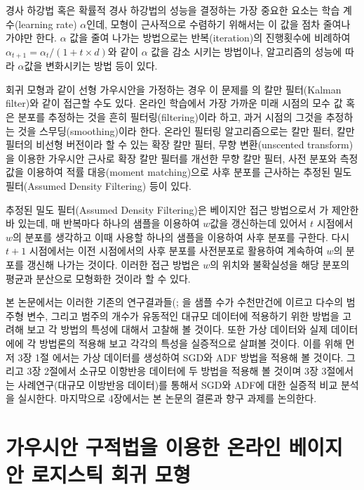 \documentclass[oneside,b5paper,11pt]{book} %
\begin{document}
 경사 하강법 혹은 확률적 경사 하강법의 성능을 결정하는 가장 중요한 요소는 학습 계수(learning rate) $\alpha$인데, 모형이 근사적으로 수렴하기 위해서는 이 값을 점차 줄여나가야만 한다. $\alpha$ 값을 줄여 나가는 방법으로는 반복(iteration)의 진행횟수에 비례하여 $\alpha_{t+1} = \alpha_{t} / (1 + t \times d )$와 같이 $\alpha$ 값을 감소 시키는 방법이나, 알고리즘의 성능에 따라 $\alpha$값을 변화시키는 방법 등이 있다. 

 회귀 모형과 같이 선형 가우시안을 가정하는 경우 이 문제를 \citet{Kalman1960}의 칼만 필터(Kalman filter)와 같이 접근할 수도 있다. 온라인 학습에서 가장 가까운 미래 시점의 모수 값 혹은 분포를 추정하는 것을 흔히 필터링(filtering)이라 하고, 과거 시점의 그것을 추정하는 것을 스무딩(smoothing)이라 한다. 온라인 필터링 알고리즘으로는 칼만 필터\citep{Kalman1960}, 칼만 필터의 비선형 버전이라 할 수 있는 확장 칼만 필터\citep{Smith1962}, 무향 변환(unscented transform)을 이용한 가우시안 근사로 확장 칼만 필터를 개선한 무향 칼만 필터\citep{Julier1997}, 사전 분포와 측정값을 이용하여 적률 대응(moment matching)으로 사후 분포를 근사하는 추정된 밀도 필터(Assumed Density Filtering)\citep{Opper1996} 등이 있다.
 
 추정된 밀도 필터(Assumed Density Filtering)은 베이지안 접근 방법으로서 \citet{Opper1996}가 제안한바 있는데, 매 반복마다 하나의 샘플을 이용하여 $w$값을 갱신하는데 있어서 $t$ 시점에서 $w$의 분포를 생각하고 이때 사용할 하나의 샘플을 이용하여 사후 분포를 구한다. 다시 $t+1$ 시점에서는 이전 시점에서의 사후 분포를 사전분포로 활용하여 계속하여 $w$의 분포를 갱신해 나가는 것이다. 이러한 접근 방법은 $w$의 위치와 불확실성을 해당 분포의 평균과 분산으로 모형화한 것이라 할 수 있다. 

 본 논문에서는 이러한 기존의 연구결과들(\citet{Bottou2010}; \citet{Opper1996}을 샘플 수가 수천만건에 이르고 다수의 범주형 변수, 그리고 범주의 개수가 유동적인 대규모 데이터에 적용하기 위한 방법을 고려해 보고 각 방법의 특성에 대해서 고찰해 볼 것이다. 또한 가상 데이터와 실제 데이터에에 각 방법론의 적용해 보고 각각의 특성을 실증적으로 살펴볼 것이다. 이를 위해 먼저 3장 1절 에서는 가상 데이터를 생성하여 SGD와 ADF 방법을 적용해 볼 것이다. 그리고 3장 2절에서 소규모 이항반응 데이터에 두 방법을 적용해 볼 것이며 3장 3절에서는 사례연구(대규모 이방반응 데이터)를 통해서 SGD와 ADF에 대한 실증적 비교 분석을 실시한다. 마지막으로 4장에서는 본 논문의 결론과 향구 과제를 논의한다.

 
%
\chapter{가우시안 구적법을 이용한 온라인 베이지안 로지스틱 회귀 모형}
 
\end{document}
